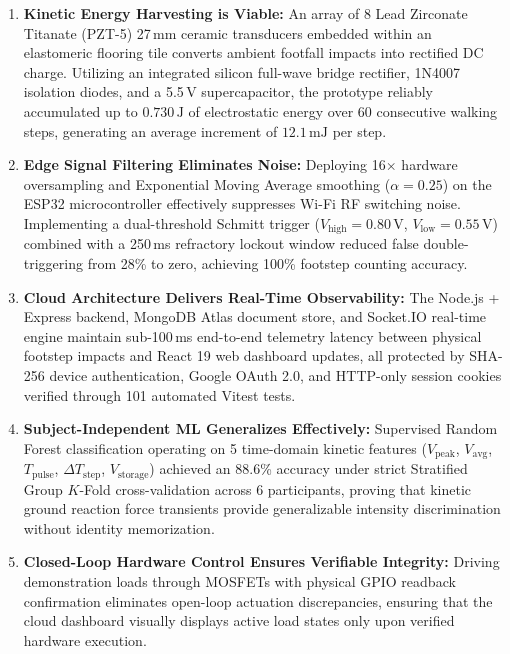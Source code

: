 \begin{enumerate}
    \item \textbf{Kinetic Energy Harvesting is Viable:} An array of 8 Lead Zirconate Titanate (PZT-5) 27\,mm ceramic transducers embedded within an elastomeric flooring tile converts ambient footfall impacts into rectified DC charge. Utilizing an integrated silicon full-wave bridge rectifier, 1N4007 isolation diodes, and a 5.5\,V supercapacitor, the prototype reliably accumulated up to $0.730\,\text{J}$ of electrostatic energy over 60 consecutive walking steps, generating an average increment of $12.1\,\text{mJ}$ per step.
    \item \textbf{Edge Signal Filtering Eliminates Noise:} Deploying 16$\times$ hardware oversampling and Exponential Moving Average smoothing ($\alpha = 0.25$) on the ESP32 microcontroller effectively suppresses Wi-Fi RF switching noise. Implementing a dual-threshold Schmitt trigger ($V_{\text{high}} = 0.80\,\text{V}$, $V_{\text{low}} = 0.55\,\text{V}$) combined with a 250\,ms refractory lockout window reduced false double-triggering from 28\% to zero, achieving 100\% footstep counting accuracy.
    \item \textbf{Cloud Architecture Delivers Real-Time Observability:} The Node.js + Express backend, MongoDB Atlas document store, and Socket.IO real-time engine maintain sub-100\,ms end-to-end telemetry latency between physical footstep impacts and React 19 web dashboard updates, all protected by SHA-256 device authentication, Google OAuth 2.0, and HTTP-only session cookies verified through 101 automated Vitest tests.
    \item \textbf{Subject-Independent ML Generalizes Effectively:} Supervised Random Forest classification operating on 5 time-domain kinetic features ($V_{\text{peak}}$, $V_{\text{avg}}$, $T_{\text{pulse}}$, $\Delta T_{\text{step}}$, $V_{\text{storage}}$) achieved an 88.6\% accuracy under strict Stratified Group $K$-Fold cross-validation across 6 participants, proving that kinetic ground reaction force transients provide generalizable intensity discrimination without identity memorization.
    \item \textbf{Closed-Loop Hardware Control Ensures Verifiable Integrity:} Driving demonstration loads through MOSFETs with physical GPIO readback confirmation eliminates open-loop actuation discrepancies, ensuring that the cloud dashboard visually displays active load states only upon verified hardware execution.
\end{enumerate}

